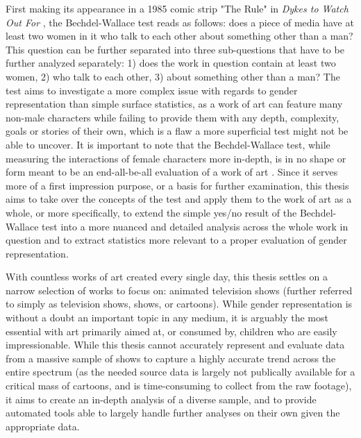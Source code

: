 \documentclass[a4paper, 11pt]{article}
\begin{document}
First making its appearance in a 1985 comic strip "The Rule" in \textit{Dykes to Watch Out For} \citep{bechdel-DTWOF}, the Bechdel-Wallace test reads as follows: does a piece of media have at least two women in it who talk to each other about something other than a man? This question can be further separated into three sub-questions that have to be further analyzed separately: 1) does the work in question contain at least two women, 2) who talk to each other, 3) about something other than a man? The test aims to investigate a more complex issue with regards to gender representation than simple surface statistics, as a work of art can feature many non-male characters while failing to provide them with any depth, complexity, goals or stories of their own, which is a flaw a more superficial test might not be able to uncover. It is important to note that the Bechdel-Wallace test, while measuring the interactions of female characters more in-depth, is in no shape or form meant to be an end-all-be-all evaluation of a work of art \citep{zeisler}. Since it serves more of a first impression purpose, or a basis for further examination, this thesis aims to take over the concepts of the test and apply them to the work of art as a whole, or more specifically, to extend the simple yes/no result of the Bechdel-Wallace test into a more nuanced and detailed analysis across the whole work in question and to extract statistics more relevant to a proper evaluation of gender representation.

With countless works of art created every single day, this thesis settles on a narrow selection of works to focus on: animated television shows (further referred to simply as television shows, shows, or cartoons). While gender representation is without a doubt an important topic in any medium, it is arguably the most essential with art primarily aimed at, or consumed by, children who are easily impressionable. While this thesis cannot accurately represent and evaluate data from a massive sample of shows to capture a highly accurate trend across the entire spectrum (as the needed source data is largely not publically available for a critical mass of cartoons, and is time-consuming to collect from the raw footage), it aims to create an in-depth analysis of a diverse sample, and to provide automated tools able to largely handle further analyses on their own given the appropriate data.
\end{document}
